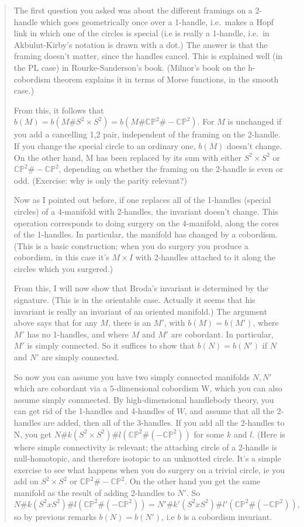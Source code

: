 \documentclass[12pt]{article}
\begin{document}
\begin{quote}
The first question you asked was about the different framings on a
2-handle which goes geometrically once over a 1-handle, i.e.~makes a
Hopf link in which one of the circles is special (i.e is really a
1-handle, i.e.~in Akbulut-Kirby's notation is drawn with a dot.) The
answer is that the framing doesn't matter, since the handles cancel.
This is explained well (in the PL case) in Rourke-Sanderson's book.
(Milnor's book on the h-cobordism theorem explains it in terms of Morse
functions, in the smooth case.)

From this, it follows that
\(b(M) = b(M\#S^2 \times S^2) = b(M\#\mathbb{CP}^2\#-\mathbb{CP}^2)\).
For \(M\) is unchanged if you add a cancelling 1,2 pair, independent of
the framing on the 2-handle. If you change the special circle to an
ordinary one, \(b(M)\) doesn't change. On the other hand, M has been
replaced by its sum with either \(S^2 \times S^2\) or
\(\mathbb{CP}^2 \# -\mathbb{CP}^2\), depending on whether the framing on
the 2-handle is even or odd. (Exercise: why is only the parity
relevant?)

Now as I pointed out before, if one replaces all of the 1-handles
(special circles) of a 4-manifold with 2-handles, the invariant doesn't
change. This operation corresponds to doing surgery on the 4-manifold,
along the cores of the 1-handles. In particular, the manifold has
changed by a cobordism. (This is a basic construction; when you do
surgery you produce a cobordism, in this case it's \(M \times I\) with
2-handles attached to it along the circles which you surgered.)

From this, I will now show that Broda's invariant is determined by the
signature. (This is in the orientable case. Actually it seems that his
invariant is really an invariant of an oriented manifold.) The argument
above says that for any \(M\), there is an \(M'\), with
\(b(M) = b(M')\), where \(M'\) has no 1-handles, and where \(M\) and
\(M'\) are cobordant. In particular, \(M'\) is simply connected. So it
suffices to show that \(b(N) = b(N')\) if \(N\) and \(N'\) are simply
connected.

So now you can assume you have two simply connected manifolds \(N,N'\)
which are cobordant via a \(5\)-dimensional cobordism W, which you can
also assume simply connnected. By high-dimensional handlebody theory,
you can get rid of the 1-handles and 4-handles of \(W\), and assume that
all the 2-handles are added, then all of the 3-handles. If you add all
the 2-handles to N, you get
\(N\#k(S^2 \times S^2)\#l(\mathbb{CP}^2\#(-\mathbb{CP}^2))\) for some
\(k\) and \(l\). (Here is where simple connectivity is relevant; the
attaching circle of a 2-handle is null-homotopic, and therefore isotopic
to an unknotted circle. It's a simple exercise to see what happens when
you do surgery on a trivial circle, ie you add on \(S^2 \times S^2\) or
\(\mathbb{CP}^2 \# -\mathbb{CP}^2\). On the other hand you get the same
manifold as the result of adding 2-handles to \(N'\). So
\[N\#k(S^2 x S^2)\#l(\mathbb{CP}^2\#(-\mathbb{CP}^2)) = N'\#k'(S^2 x S^2)\#l'(\mathbb{CP}^2\#(-\mathbb{CP}^2)),\]
so by previous remarks \(b(N) = b(N')\), i.e \(b\) is a cobordism
invariant.


\end{quote}
\end{document}
